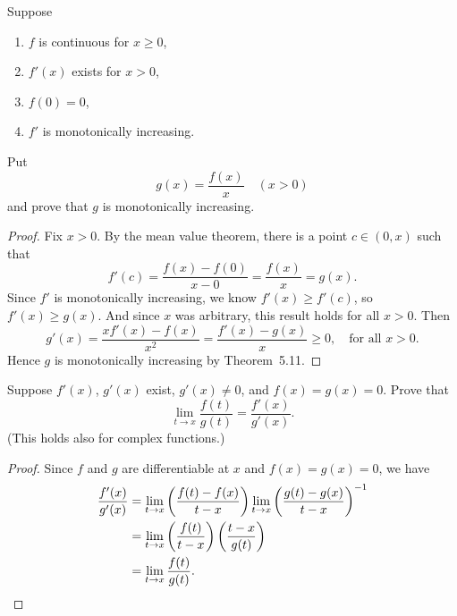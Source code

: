  Suppose
\begin{enumerate}
\item $f$ is continuous for $x\geq0$,
\item $f'(x)$ exists for $x > 0$,
\item $f(0) = 0$,
\item $f'$ is monotonically increasing.
\end{enumerate}
Put
\begin{equation*}
  g(x) = \frac{f(x)}x \quad(x > 0)
\end{equation*}
and prove that $g$ is monotonically increasing.
\begin{proof}
  Fix $x > 0$. By the mean value theorem, there is a point $c\in(0,x)$
  such that
  \begin{equation*}
    f'(c) = \frac{f(x) - f(0)}{x - 0} = \frac{f(x)}x = g(x).
  \end{equation*}
  Since $f'$ is monotonically increasing, we know $f'(x) \geq f'(c)$,
  so $f'(x) \geq g(x)$. And since $x$ was arbitrary, this result holds
  for all $x > 0$. Then
  \begin{equation*}
    g'(x) = \frac{xf'(x) - f(x)}{x^2}
    = \frac{f'(x) - g(x)}x
    \geq 0,
    \quad\text{for all $x > 0$}.
  \end{equation*}
  Hence $g$ is monotonically increasing by Theorem~5.11.
\end{proof}

 Suppose $f'(x)$, $g'(x)$ exist, $g'(x)\neq0$, and
$f(x) = g(x) = 0$. Prove that
\begin{equation*}
  \lim_{t\to x}\frac{f(t)}{g(t)} = \frac{f'(x)}{g'(x)}.
\end{equation*}
(This holds also for complex functions.)
\begin{proof}
  Since $f$ and $g$ are differentiable at $x$ and $f(x) = g(x) = 0$,
  we have
  \begin{align*}
    \frac{f'(x)}{g'(x)}
    &= \lim_{t\to x}\left(\frac{f(t) - f(x)}{t - x}\right)
      \lim_{t\to x}\left(\frac{g(t) - g(x)}{t - x}\right)^{-1} \\
    &= \lim_{t\to x}\left(\frac{f(t)}{t-x}\right)
      \left(\frac{t-x}{g(t)}\right) \\
    &= \lim_{t\to x}\frac{f(t)}{g(t)}. \qedhere
  \end{align*}
\end{proof}

